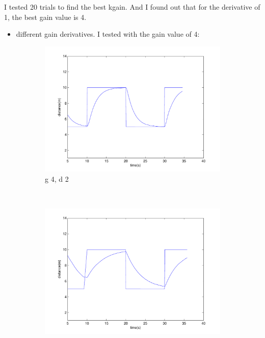 I tested 20 trials to find the best kgain. And I found out that for the derivative of 1, the best gain value is 4.

\begin{itemize}
\item different gain derivatives. I tested with the gain value of 4:
\end{itemize}

\begin{figure}
        \centering
        \begin{subfigure}[b]{0.3\textwidth}
                \includegraphics[width=\textwidth]{fig/gain4d2.pdf}
                \caption{g 4, d 2}
                \label{fig:gull}
        \end{subfigure}%
        ~ %
        \begin{subfigure}[b]{0.3\textwidth}
                \includegraphics[width=\textwidth]{fig/gain4d4.pdf}

\end{subfigure}
\end{figure}

